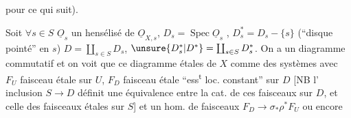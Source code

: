

pour ce qui suit). 

Soit $\forall s\in S$ $\underline{O}_s$ un hensélisé de $\underline{O}_{X,s}$,
$D_s=\operatorname{Spec}\underline{O}_s$ , $D_s^{*}=D_s-\{s\}$  (``disque pointé'' en
$s$) $D=\coprod_{s\in S}D_s$, $\unsure{D_s^{*}|D^{*}}=\coprod_{s\in S}D_s^{*}$. On a
un diagramme commutatif
et on voit  que ce diagramme  
  étales de $X$ 
comme des systèmes  
avec $F_U$ faisceau étale sur $U$, $F_D$ faisceau
étale ``ess\textsuperscript{t} loc. constant'' sur $D$ [NB l'
inclusion $S\to D$ définit une équivalence
entre la cat. de ces faisceaux sur $D$, et
celle des faisceaux étales sur $S$] et
un hom. de faisceaux $F_D\to\sigma_{*}\rho^{*}F_U$ ou encore

